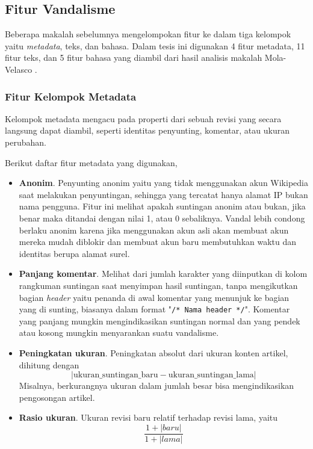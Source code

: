 \subsection{Fitur Vandalisme}

Beberapa makalah sebelumnya mengelompokan fitur ke dalam tiga kelompok yaitu
\textit{metadata}, teks, dan bahasa.
Dalam tesis ini digunakan 4 fitur metadata, 11 fitur teks, dan 5 fitur
bahasa yang diambil dari hasil analisis makalah Mola-Velasco
\cite{mola2012wikipedia}.

\subsubsection{Fitur Kelompok Metadata}

Kelompok metadata mengacu pada properti dari sebuah revisi yang secara langsung
dapat diambil, seperti identitas penyunting, komentar, atau ukuran perubahan.

Berikut daftar fitur metadata yang digunakan,

\begin{itemize}

\item \textbf{Anonim}.
Penyunting anonim yaitu yang tidak menggunakan akun Wikipedia saat melakukan
penyuntingan, sehingga yang tercatat hanya alamat IP bukan nama pengguna.
Fitur ini melihat apakah suntingan anonim atau bukan, jika benar maka ditandai
dengan nilai 1, atau 0 sebaliknya.
Vandal lebih condong berlaku anonim karena jika menggunakan akun asli akan
membuat akun mereka mudah diblokir dan membuat akun baru membutuhkan waktu dan
identitas berupa alamat surel.

\item \textbf{Panjang komentar}.
Melihat dari jumlah karakter yang diinputkan di kolom rangkuman suntingan saat
menyimpan hasil suntingan, tanpa mengikutkan bagian \textit{header} yaitu
penanda di awal komentar yang menunjuk ke bagian yang di sunting, biasanya
dalam format "\texttt{/* Nama header */}".
Komentar yang panjang mungkin mengindikasikan suntingan normal dan yang pendek
atau kosong mungkin menyarankan suatu vandalisme.

\item \textbf{Peningkatan ukuran}.
Peningkatan absolut dari ukuran konten artikel, dihitung dengan
\[
|\text{ukuran\_suntingan\_baru} - \text{ukuran\_suntingan\_lama}|
\]
Misalnya, berkurangnya ukuran dalam jumlah besar bisa mengindikasikan
pengosongan artikel.

\item \textbf{Rasio ukuran}.
Ukuran revisi baru relatif terhadap revisi lama, yaitu
\[
\frac{1 + |baru|}{1 + |lama|}
\]

\end{itemize}


